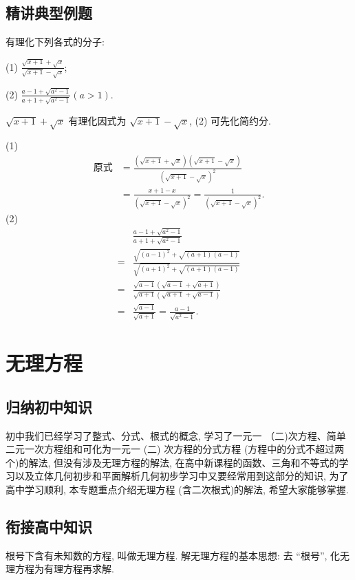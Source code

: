 \subsection{精讲典型例题}
\begin{example}
	有理化下列各式的分子:

	(1) $\frac{\sqrt{x+1}+\sqrt{x}}{\sqrt{x+1}-\sqrt{x}}$;

	(2) $\frac{a-1+\sqrt{a^2-1}}{a+1+\sqrt{a^2-1}}(a>1)$.
\end{example}
\begin{analysis}
	$\sqrt{x+1}+\sqrt{x}$ 有理化因式为 $\sqrt{x+1}-\sqrt{x}$, (2) 可先化简约分.
\end{analysis}
\begin{solution}
	(1)
	\begin{align}
		\text{原式} & =\frac{(\sqrt{x+1}+\sqrt{x})(\sqrt{x+1}-\sqrt{x})}{(\sqrt{x+1}-\sqrt{x})^2} \\
		            & =\frac{x+1-x}{(\sqrt{x+1}-\sqrt{x})^2}=\frac{1}{(\sqrt{x+1}-\sqrt{x})^2} .
	\end{align}
	(2)
	\begin{align}
		  & \frac{a-1+\sqrt{a^2-1}}{a+1+\sqrt{a^2-1}}                                   \\
		= & \frac{\sqrt{(a-1)^2}+\sqrt{(a+1)(a-1)}}{\sqrt{(a+1)^2}+\sqrt{(a+1)(a-1)}}   \\
		= & \frac{\sqrt{a-1}(\sqrt{a-1}+\sqrt{a+1})}{\sqrt{a+1}(\sqrt{a+1}+\sqrt{a-1})} \\
		= & \frac{\sqrt{a-1}}{\sqrt{a+1}}=\frac{a-1}{\sqrt{a^2-1}} .
	\end{align}
\end{solution}

\section{无理方程}
\subsection{归纳初中知识}
初中我们已经学习了整式、分式、根式的概念, 学习了一元一 （二)次方程、简单二元一次方程组和可化为一元一 (二) 次方程的分式方程 (方程中的分式不超过两个)的解法, 但没有涉及无理方程的解法, 在高中新课程的函数、三角和不等式的学习以及立体几何初步和平面解析几何初步学习中又要经常用到这部分的知识, 为了高中学习顺利, 本专题重点介绍无理方程 (含二次根式)的解法, 希望大家能够掌握.

\subsection{衔接高中知识}
根号下含有未知数的方程, 叫做无理方程.
解无理方程的基本思想: 去 “根号”, 化无理方程为有理方程再求解.

